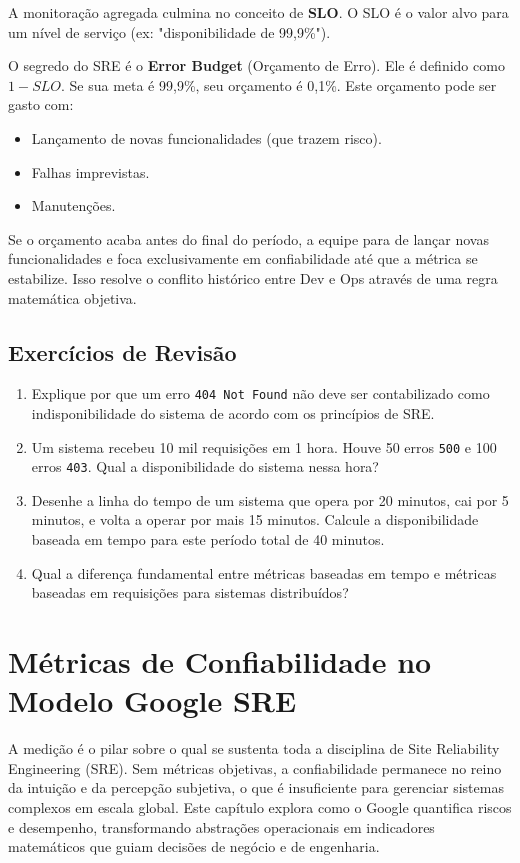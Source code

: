 \documentclass[12pt,a4paper]{report}
\begin{document}
A monitoração agregada culmina no conceito de \textbf{SLO}. O SLO é o valor alvo para um nível de serviço (ex: "disponibilidade de 99,9\%"). 

O segredo do SRE é o \textbf{Error Budget} (Orçamento de Erro). Ele é definido como $1 - SLO$. Se sua meta é 99,9\%, seu orçamento é 0,1\%.
Este orçamento pode ser gasto com:
\begin{itemize}
    \item Lançamento de novas funcionalidades (que trazem risco).
    \item Falhas imprevistas.
    \item Manutenções.
\end{itemize}

Se o orçamento acaba antes do final do período, a equipe para de lançar novas funcionalidades e foca exclusivamente em confiabilidade até que a métrica se estabilize. Isso resolve o conflito histórico entre Dev e Ops através de uma regra matemática objetiva.

\section{Exercícios de Revisão}

\begin{enumerate}
    \item Explique por que um erro \texttt{404 Not Found} não deve ser contabilizado como indisponibilidade do sistema de acordo com os princípios de SRE.
    \item Um sistema recebeu 10 mil requisições em 1 hora. Houve 50 erros \texttt{500} e 100 erros \texttt{403}. Qual a disponibilidade do sistema nessa hora?
    \item Desenhe a linha do tempo de um sistema que opera por 20 minutos, cai por 5 minutos, e volta a operar por mais 15 minutos. Calcule a disponibilidade baseada em tempo para este período total de 40 minutos.
    \item Qual a diferença fundamental entre métricas baseadas em tempo e métricas baseadas em requisições para sistemas distribuídos?
\end{enumerate}

\chapter{Métricas de Confiabilidade no Modelo Google SRE}

A medição é o pilar sobre o qual se sustenta toda a disciplina de Site Reliability Engineering (SRE). Sem métricas objetivas, a confiabilidade permanece no reino da intuição e da percepção subjetiva, o que é insuficiente para gerenciar sistemas complexos em escala global. Este capítulo explora como o Google quantifica riscos e desempenho, transformando abstrações operacionais em indicadores matemáticos que guiam decisões de negócio e de engenharia.
\end{document}
